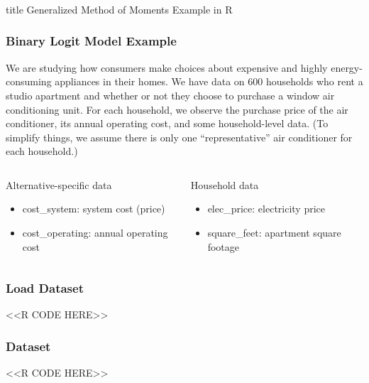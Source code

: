 \documentclass{beamer}
\begin{document}
\begin{frame}\frametitle{}
    \vfill
    \centering
    \begin{beamercolorbox}[center]{title}
        \Large Generalized Method of Moments Example in R
    \end{beamercolorbox}
    \vfill
\end{frame}

\begin{frame}\frametitle{Binary Logit Model Example}
    We are studying how consumers make choices about expensive and highly energy-consuming appliances in their homes. We have data on 600 households who rent a studio apartment and whether or not they choose to purchase a window air conditioning unit. For each household, we observe the purchase price of the air conditioner, its annual operating cost, and some household-level data. (To simplify things, we assume there is only one ``representative'' air conditioner for each household.)
    \vspace{3ex}
    \begin{columns}
        \begin{column}{0.5\textwidth}
            Alternative-specific data
            \begin{itemize}
                \item cost\_system: system cost (price)
                \item cost\_operating: annual operating cost
            \end{itemize}
        \end{column}
        \begin{column}{0.5\textwidth}
            Household data
            \begin{itemize}
                \item elec\_price: electricity price
                \item square\_feet: apartment square footage
            \end{itemize}
            \vspace{2ex}
        \end{column}
    \end{columns}
\end{frame}

\begin{frame}[fragile]\frametitle{Load Dataset}
    <<R CODE HERE>>
\end{frame}

\begin{frame}[fragile]\frametitle{Dataset}
    <<R CODE HERE>>
\end{frame}
\end{document}
